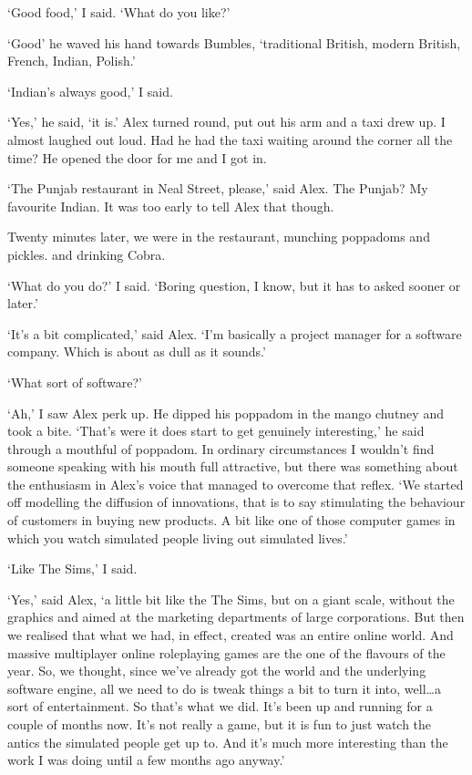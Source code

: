 `Good food,' I said. `What do you like?'

`{\twelveit Good\/}' he waved his hand towards Bumbles,
`traditional British, modern British, French, Indian, Polish.'

`Indian's always good,' I said.

`Yes,' he said, `it is.' Alex turned round, put out his arm and a taxi
drew up. I almost laughed out loud. Had he had the taxi waiting around the corner all the time?
He opened the door for me and I got in.

`The Punjab restaurant in Neal Street, please,' said Alex. The
Punjab? My {\twelveit favourite\/} Indian. It was too
early to tell Alex that though.

Twenty minutes later, we were in the restaurant, munching poppadoms and pickles.
and drinking Cobra.

`What do you do?' I said. `Boring question, I know, but it has to asked
sooner or later.'

`It's a bit complicated,' said Alex. `I'm basically a project manager for
a software company. Which is about as dull as it sounds.'

`What sort of software?'

`Ah,' I saw Alex perk up. He dipped his poppadom in the mango
chutney and took a bite. `That's were it does start to get genuinely
interesting,' he said through a mouthful of poppadom. In ordinary
circumstances I wouldn't find someone speaking with his mouth full
attractive, but there was something about the enthusiasm in Alex's
voice that managed to overcome that reflex. `We started off
modelling the diffusion of innovations, that is to say stimulating
the behaviour of customers in buying new products. A bit like one of
those computer games in which you watch simulated people living
out simulated lives.'

`Like {\twelvesl The Sims\/},' I said.

`Yes,' said Alex, `a little bit like the {\twelvesl The Sims\/}, but on a
giant scale, without the graphics and aimed at the marketing
departments of large corporations. But then we realised that what we
had, in effect, created was an entire online world. And massive
multiplayer online roleplaying games are the one of the flavours of
the year. So, we thought, since we've already got the world and the
underlying software engine, all we need to do is tweak things a bit
to turn it into, well\dots a sort of entertainment. So that's what
we did. It's been up and running for a couple of months now. It's not really a game, but it is fun to just watch the antics the simulated people get up to. And it's much more interesting than the work
I was doing until a few months ago anyway.'

